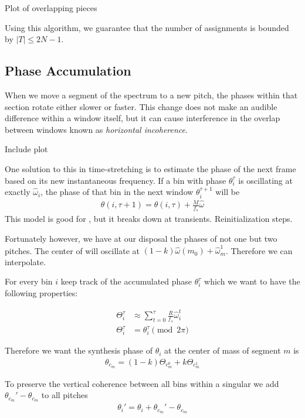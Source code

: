 \documentclass[12pt]{article}
\begin{document}
Plot of overlapping pieces

Using this algorithm, we guarantee that the number of assignments is bounded by $|T| \leq 2N - 1$.

\subsection{Phase Accumulation}

When we move a segment of the spectrum to a new pitch, 
the phases within that section rotate either slower or faster.
This change does not make an audible difference within a window itself,
but it can cause interference in the overlap between windows known as \emph{horizontal incoherence}.

Include plot

One solution to this in time-stretching is to estimate the phase of the next frame based on its new instantaneous frequency. 
If a bin with phase $\theta_i^\tau$ is oscillating at exactly $\hat{\omega}_i$, the phase of that bin in the next window $\theta_i^{\tau+1}$ will be
\begin{align*}
  \theta(i, \tau+1) = 
  \theta(i,\tau) + \frac{M}{f_s}\hat{\omega}
\end{align*}
This model is good for , but it breaks down at transients.
Reinitialization steps.


Fortunately however, we have at our disposal the phases of not one but two pitches.
The center of  will oscillate at $(1 - k)\hat{\omega}(m_0) + \hat{\omega}^1_m$.
Therefore we can interpolate.

For every bin $i$ keep track of the accumulated phase $\theta_i^\tau$ which we want to have the following properties:

\begin{align*}
  \Theta_i^\tau &\approx
  \sum_{t = 0}^\tau 
  \frac{R}{f_s}\hat{\omega}_i^t\\
  \Theta_i^\tau &= \theta_i^\tau\pmod{2\pi}
\end{align*}



Therefore we want the synthesis phase of $\theta_i$ at the center of mass of segment $m$ is
\begin{align*}
  \theta_{c_m} = (1-k)\Theta_{c_m^0} + k\Theta_{c_m^1}
\end{align*}

To preserve the vertical coherence between all bins within a singular
we add $\theta_{c_m}' - \theta_{c_m}$ to all pitches
\begin{align*}
  \theta_i' = \theta_i + \theta_{c_m}' - \theta_{c_m}
\end{align*}
\end{document}
